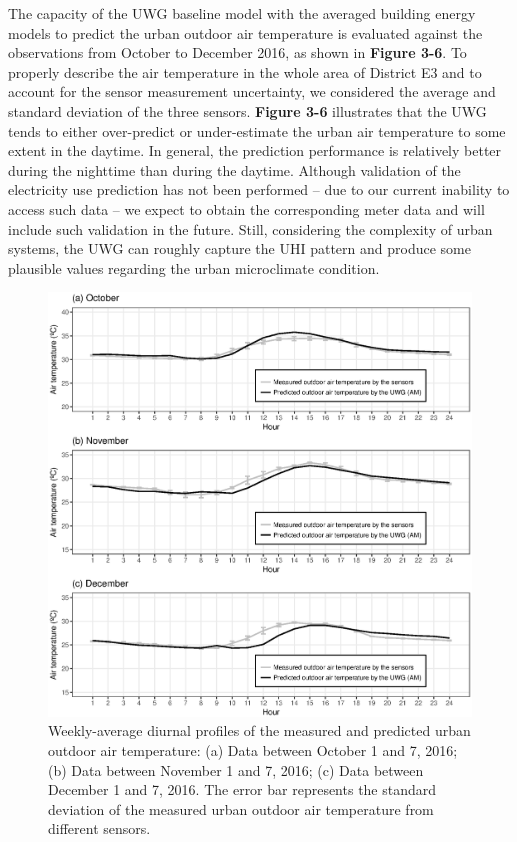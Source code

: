 The capacity of the UWG baseline model with the averaged building energy models to predict the urban outdoor air temperature is evaluated against the observations from October to December 2016, as shown in \textbf{Figure 3-6}. To properly describe the air temperature in the whole area of District E3 and to account for the sensor measurement uncertainty, we considered the average and standard deviation of the three sensors. \textbf{Figure 3-6} illustrates that the UWG tends to either over-predict or under-estimate the urban air temperature to some extent in the daytime. In general, the prediction performance is relatively better during the nighttime than during the daytime. Although validation of the electricity use prediction has not been performed -- due to our current inability to access such data -- we expect to obtain the corresponding meter data and will include such validation in the future. Still, considering the complexity of urban systems, the UWG can roughly capture the UHI pattern and produce some plausible values regarding the urban microclimate condition.

\begin{figure}
\centering
\includegraphics[width=.8\linewidth]{Figure3-6.eps}
\caption{Weekly-average diurnal profiles of the measured and predicted urban outdoor air temperature: (a) Data between October 1 and 7, 2016; (b) Data between November 1 and 7, 2016; (c) Data between December 1 and 7, 2016. The error bar represents the standard deviation of the measured urban outdoor air temperature from different sensors.}
\end{figure}

